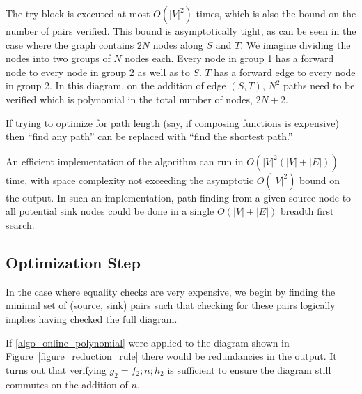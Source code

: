 \documentclass[sigplan,review,nonacm=true]{acmart}
\begin{document}
{The try block is executed at most $O(|V|^2)$ times, which is also the bound on the number of pairs verified.
%
This bound is asymptotically tight, as can be seen in the case where the graph contains $2N$ nodes along $S$ and $T$.
We imagine dividing the nodes into two groups of $N$ nodes each. Every node in group 1 has a forward node to every node in group 2 as well as to $S$. $T$ has a forward edge to every node in group 2. In this diagram, on the addition of edge $(S, T)$, $N^2$ paths need to be verified which is polynomial in the total number of nodes, $2N+2$.

If trying to optimize for path length (say, if composing functions is expensive) then ``find any path'' can be replaced with ``find the shortest path.''

An efficient implementation of the algorithm can run in $O(|V|^2(|V|+|E|))$ time, with space complexity not exceeding the asymptotic $O(|V|^2)$ bound on the output.
In such an implementation, path finding from a given source node to all potential sink nodes could be done in a single $O(|V|+|E|)$ breadth first search.

\subsection{Optimization Step}

In the case where equality checks are very expensive, we begin by finding the minimal set of (source, sink) pairs such that checking for these pairs logically implies having checked the full diagram.

If \ref{algo_online_polynomial} were applied to the diagram shown in Figure~\ref{figure_reduction_rule} there would be redundancies in the output.
It turns out that verifying $g_2=f_2 ; n ; h_2$ is sufficient to ensure the diagram still commutes on the addition of $n$.

}
\end{document}
